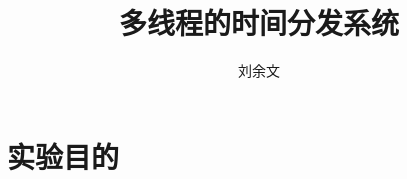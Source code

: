 \documentclass[a4paper]{article}
\begin{document}
  \begin{CJK}{UTF8}{gbsn}
    \author{刘余文}
    \title{多线程的时间分发系统}

    \begin{titlepage}
      \maketitle
      \thispagestyle{empty}
    \end{titlepage}

    \section{实验目的}
  \end{CJK}
\end{document}
